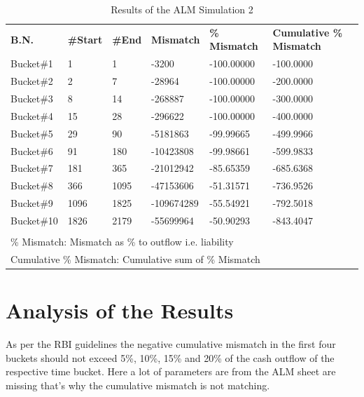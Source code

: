 \begin{table}[h!]
  \begin{center}
    \caption{Results of the ALM Simulation 2}
    \label{tab:Results of the ALM Simulation 2}
    \begin{tabular}{l|l|l|l|l|l} %
      \hline
      \textbf{B.N.} & \textbf{\#Start} & \textbf{\#End} & \textbf{Mismatch}& \textbf{\% Mismatch}& \textbf{Cumulative \% Mismatch}\\
	\hdashline
	\hdashline
	Bucket\#1 & 1 & 1 &  -3200 & -100.00000 & -100.0000 \\
	\hline
	Bucket\#2 & 2 &  7 & -28964 & -100.00000 & -200.0000  \\
	\hline
	Bucket\#3 & 8 & 14 & -268887 & -100.00000 & -300.0000  \\
	\hline
	Bucket\#4 & 15 & 28 & -296622 & -100.00000 & -400.0000  \\
	\hline
	Bucket\#5 & 29 & 90 & -5181863 & -99.99665 & -499.9966  \\
	\hline
	Bucket\#6 & 91 & 180 & -10423808 & -99.98661 & -599.9833  \\
	\hline
	Bucket\#7 & 181 & 365 & -21012942 & -85.65359 & -685.6368    \\
	\hline
	Bucket\#8 & 366 & 1095 & -47153606 & -51.31571 & -736.9526    \\
	\hline
	Bucket\#9 & 1096 & 1825 & -109674289 & -55.54921 & -792.5018   \\
	\hline
	Bucket\#10 & 1826 & 2179 & -55699964 & -50.90293 & -843.4047  \\

	\hdashline
	\hdashline
	\multicolumn{5}{l}{Mismatch: Difference in assets and liabilities} \\
	\multicolumn{5}{l}{\% Mismatch: Mismatch as \% to outflow i.e. liability} \\
	\multicolumn{5}{l}{Cumulative \% Mismatch: Cumulative sum of \% Mismatch} \\
	\hline
    \end{tabular}
  \end{center}
\end{table}

\section{Analysis of the Results}

As per the RBI guidelines the negative cumulative mismatch in the first four buckets should not exceed 5\%, 10\%, 15\% and 20\% of the cash outflow of the respective time bucket.
Here a lot of parameters are from the ALM sheet are missing that's why the cumulative mismatch is not matching.\\

